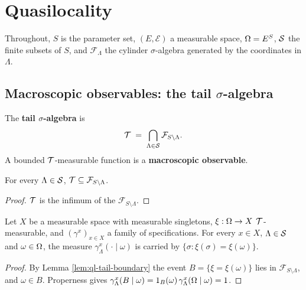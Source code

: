 \section{Quasilocality}

Throughout, $S$ is the parameter set, $(E, \mathcal{E})$ a measurable space, $\Omega = E^S$,
$\mathcal{S}$ the finite subsets of $S$, and $\mathcal{F}_\Lambda$ the cylinder $\sigma$-algebra
generated by the coordinates in $\Lambda$.

\subsection*{Macroscopic observables: the tail \texorpdfstring{$\sigma$}{sigma}-algebra}

\begin{definition}
    \label{def:ql-tail}
    \leanok

    The \textbf{tail $\sigma$-algebra} is
    \[\mathcal{T} \;=\; \bigcap_{\Lambda \in \mathcal{S}} \mathcal{F}_{S \setminus \Lambda}.\]
    A bounded $\mathcal{T}$-measurable function is a \textbf{macroscopic observable}.
\end{definition}

\begin{lemma}
    \label{lem:ql-tail-boundary}
    \leanok

    For every $\Lambda \in \mathcal{S}$, $\mathcal{T} \subseteq \mathcal{F}_{S\setminus\Lambda}$.
\end{lemma}
\begin{proof}
    \leanok

    $\mathcal{T}$ is the infimum of the $\mathcal{F}_{S\setminus\Lambda}$.
\end{proof}

\begin{lemma}
    \label{lem:ql-spec-preserves-tail}
    \leanok

    Let $X$ be a measurable space with measurable singletons, $\xi : \Omega \to X$
    $\mathcal{T}$-measurable, and $(\gamma^x)_{x \in X}$ a family of specifications. For every $x \in X$,
    $\Lambda \in \mathcal{S}$ and $\omega \in \Omega$, the measure $\gamma^x_\Lambda(\cdot \mid \omega)$ is
    carried by $\{\sigma : \xi(\sigma) = \xi(\omega)\}$.
\end{lemma}
\begin{proof}
    \leanok

    By Lemma \ref{lem:ql-tail-boundary} the event $B = \{\xi = \xi(\omega)\}$ lies in
    $\mathcal{F}_{S\setminus\Lambda}$, and $\omega \in B$. Properness gives
    $\gamma^x_\Lambda(B \mid \omega) = 1_B(\omega)\,\gamma^x_\Lambda(\Omega \mid \omega) = 1$.
\end{proof}

